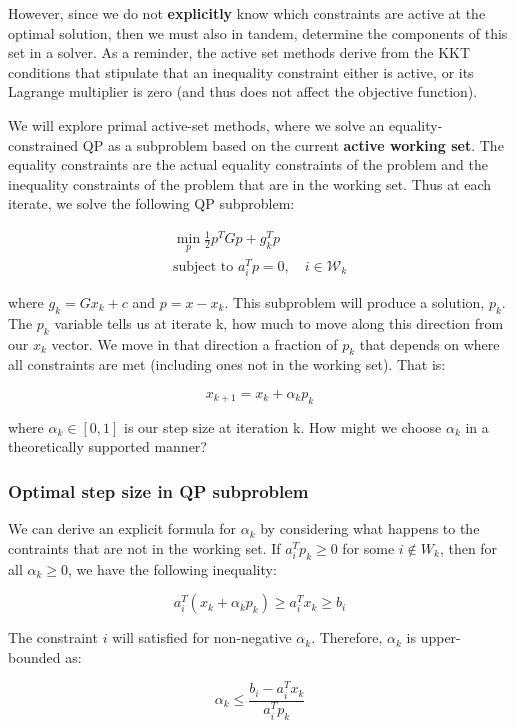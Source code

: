 \documentclass[class=article, crop=false]{standalone}
\begin{document}
		However, since we do not \textbf{explicitly} know which constraints are active at the optimal solution, then we must also in tandem, determine the components of this set in a solver. As a reminder, the active set methods derive from the KKT conditions that stipulate that an inequality constraint either is active, or its Lagrange multiplier is zero (and thus does not affect the objective function).

		We will explore primal active-set methods, where we solve an equality-constrained QP as a subproblem based on the current \textbf{active working set}. The equality constraints are the actual equality constraints of the problem and the inequality constraints of the problem that are in the working set. Thus at each iterate, we solve the following QP subproblem:

		\begin{align}
			\min_p \frac{1}{2} p^T G p + g_k^T p \\
			\text{subject to } a_i^T p = 0, \quad i \in \mathcal{W}_k
		\end{align}

		where $g_k = G x_k + c$ and $p = x - x_k$. This subproblem will produce a solution, $p_k$. The $p_k$ variable tells us at iterate k, how much to move along this direction from our $x_k$ vector. We move in that direction a fraction of $p_k$ that depends on where all constraints are met (including ones not in the working set). That is:

			$$x_{k+1} = x_k + \alpha_k p_k$$

		where $\alpha_k \in [0, 1]$ is our step size at iteration k. How might we choose $\alpha_k$ in a theoretically supported manner?

		\subsubsection{Optimal step size in QP subproblem}
			We can derive an explicit formula for $\alpha_k$ by considering what happens to the contraints that are not in the working set. If $a_i^T p_k \ge 0$ for some $i \notin W_k$, then for all $\alpha_k \ge 0$, we have the following inequality:

				$$a_i^T (x_k + \alpha_k p_k) \ge a_i^T x_k \ge b_i$$

			The constraint $i$ will satisfied for non-negative $\alpha_k$. Therefore, $\alpha_k$ is upper-bounded as:

				$$\alpha_k \le \frac{b_i - a_i^T x_k}{a_i^T p_k}$$
\end{document}
